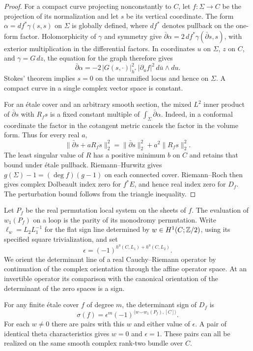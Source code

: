 \begin{proof}
For a compact curve projecting nonconstantly to $C$, let $f:\Sigma\to C$
be the projection of its normalization and let $s$ be its vertical
coordinate. The form $\alpha=df^*\gamma(s,s)$ on $\Sigma$ is globally
defined, where $df^*$ denotes pullback on the one-form factor.
Holomorphicity of $\gamma$ and symmetry give
$\bar\partial\alpha=2\,df^*\gamma(\bar\partial s,s)$, with exterior
multiplication in the differential factors. In coordinates $u$ on
$\Sigma$, $z$ on $C$, and $\gamma=G\,dz$, the equation for the graph
therefore gives
\[
  \bar\partial\alpha
    =-2\,|G(s,\cdot)|_{h^*}^{2}\,|\partial_u f|^2\,d\bar u\wedge du .
\]
Stokes' theorem implies $s=0$ on the unramified locus and hence on
$\Sigma$. A compact curve in a single complex vector space is constant.

For an \'etale cover and an arbitrary smooth section, the mixed
$L^2$ inner product of $\bar\partial s$ with $R_f s$ is a fixed
constant multiple of $\int_\Sigma\bar\partial\alpha$. Indeed, in a
conformal coordinate the factor in the cotangent metric cancels the
factor in the volume form. Thus for every real $a$,
\begin{equation}\label{eq:spin-norm}
 \|\bar\partial s+a R_f s\|_2^2
   =\|\bar\partial s\|_2^2+a^2\|R_f s\|_2^2 .
\end{equation}
The least singular value of $R$ has a positive minimum $b$ on $C$
and retains that bound under \'etale pullback. Riemann--Hurwitz
gives $g(\Sigma)-1=(\deg f)(g-1)$ on each connected cover.
Riemann--Roch then gives complex Dolbeault index zero for $f^*E$,
and hence real index zero for $D_f$. The perturbation bound follows
from the triangle inequality.
\end{proof}

Let $P_f$ be the real permutation local system on the sheets of $f$.
The evaluation of $w_1(P_f)$ on a loop is the parity of its
monodromy permutation. Write $\ell_w=L_2L_1^{-1}$ for the flat
sign line determined by $w\in H^1(C;\mathbb Z/2)$, using its specified
square trivialization, and set
\[
            \epsilon=(-1)^{h^0(C,L_1)+h^0(C,L_2)} .
\]
We orient the determinant line of a real Cauchy--Riemann operator
by continuation of the complex orientation through the affine
operator space. At an invertible operator its comparison with the
canonical orientation of the determinant of the zero spaces is a
sign.

\begin{proposition}\label{prop:spin-sign}
For any finite \'etale cover $f$ of degree $m$, the determinant sign of
$D_f$ is
\begin{equation}\label{eq:spin-sign}
        \sigma(f)=\epsilon^m
        (-1)^{\langle w\smile w_1(P_f),[C]\rangle}.
\end{equation}
For each $w\ne0$ there are pairs with this $w$ and either value of
$\epsilon$. A pair of identical theta characteristics gives $w=0$
and $\epsilon=1$. These pairs can all be realized on the same
smooth complex rank-two bundle over $C$.
\end{proposition}

